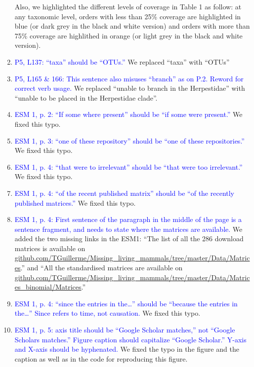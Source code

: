 \documentclass[12pt,letterpaper]{article}
\begin{document}
\begin{enumerate}
Also, we highlighted the different levels of coverage in Table 1 as follow: at any taxonomic level, orders with less than 25\% coverage are highlighted in blue (or dark grey in the black and white version) and orders with more than 75\% coverage are highlithed in orange (or light grey in the black and white version).

\item{\textcolor{blue}{P5, L137: ``taxa'' should be ``OTUs.''}}
We replaced ``taxa'' with ``OTUs''

\item{\textcolor{blue}{P5, L165 \& 166: This sentence also misuses ``branch'' as on P.2. Reword for correct verb usage.}}
We replaced ``unable to branch in the Herpestidae'' with ``unable to be placed in the Herpestidae clade''.

\item{\textcolor{blue}{ESM 1, p. 2: ``If some where present'' should be ``if some were present.''}}
We fixed this typo.

\item{\textcolor{blue}{ESM 1, p. 3: ``one of these repository'' should be ``one of these repositories.''}}
We fixed this typo.

\item{\textcolor{blue}{ESM 1, p. 4: ``that were to irrelevant'' should be ``that were too irrelevant.''}}
We fixed this typo.

\item{\textcolor{blue}{ESM 1, p. 4: ``of the recent published matrix'' should be ``of the recently published matrices.''}}
We fixed this typo.

\item{\textcolor{blue}{ESM 1, p. 4: First sentence of the paragraph in the middle of the page is a sentence fragment, and needs to state where the matrices are available.}}
We added the two missing links in the ESM1: ``The list of all the 286 download matrices is available on \url{github.com/TGuillerme/Missing_living_mammals/tree/master/Data/Matrices}.'' and ``All the standardised matrices are available on \url{github.com/TGuillerme/Missing_living_mammals/tree/master/Data/Matrices_binomial/Matrices}.''

\item{\textcolor{blue}{ESM 1, p. 4: ``since the entries in the…'' should be ``because the entries in the…'' Since refers to time, not causation.}}
We fixed this typo.

\item{\textcolor{blue}{ESM 1, p. 5: axis title should be ``Google Scholar matches,'' not ``Google Scholars matches.'' Figure caption should capitalize ``Google Scholar.'' Y-axis and X-axis should be hyphenated.}}
We fixed the typo in the figure and the caption as well as in the code for reproducing this figure.


\end{enumerate}
\end{document}
